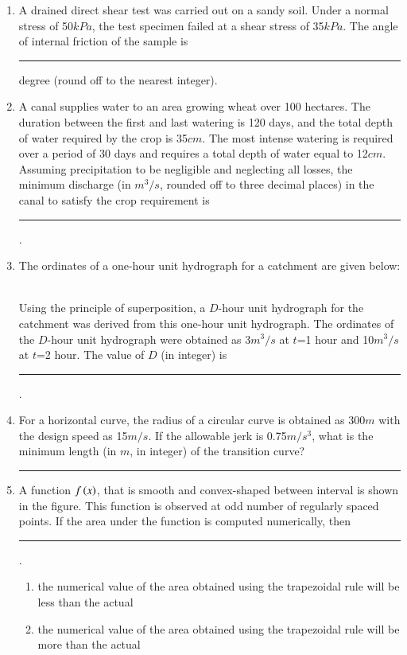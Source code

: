 \documentclass[journal,12pt,onecolumn]{IEEEtran}
\theoremstyle{remark}
\begin{document}
\begin{enumerate}
\begin{figure}[H]
    \centering
    
 \end{figure}
\item A drained direct shear test was carried out on a sandy soil. Under a normal stress of
50$kPa$, the test specimen failed at a shear stress of 35$kPa$. The angle of internal
friction of the sample is \rule{2cm}{0.15mm} degree (round off to the nearest integer).
\item A canal supplies water to an area growing wheat over 100 hectares. The duration between the first and last watering is 120 days, and the total depth of water required by the crop is 35$cm$. The most intense watering is required over a period of 30 days and requires a total depth of water equal to 12$cm$. Assuming precipitation to be negligible and neglecting all losses, the minimum discharge (in $m^3/s$, rounded off to three decimal places) in the canal to satisfy the crop requirement is \rule{2cm}{0.15mm}.
\item The ordinates of a one-hour unit hydrograph for a catchment are given below:
\begin{table}[h]
\centering

\end{table}\\
Using the principle of superposition, a $D$-hour unit hydrograph for the catchment was derived from this one-hour unit hydrograph. The ordinates of the $D$-hour unit hydrograph were obtained as 3$m^3/s$ at $t$=1 hour and 10$m^3/s$ at $t$=2 hour. The value of $D$ (in integer) is \rule{2cm}{0.15mm}.
\item For a horizontal curve, the radius of a circular curve is obtained as 300$m$ with the design speed as 15$m/s$. If the allowable jerk is 0.75$m/s^3$, what is the minimum length (in $m$, in integer) of the transition curve?\rule{2cm}{0.15mm}
\item A function $f\left(x\right)$, that is smooth and convex-shaped between interval  is shown in the figure. This function is observed at odd number of regularly spaced points. If the area under the function is computed numerically, then \rule{2cm}{0.15mm}.
\begin{figure}[H]
    \centering
    
 \end{figure}
\begin{enumerate}
\item the numerical value of the area obtained using the trapezoidal rule will be less than the actual
\item the numerical value of the area obtained using the trapezoidal rule will be more than the actual

\end{enumerate}
\end{enumerate}
\end{document}
